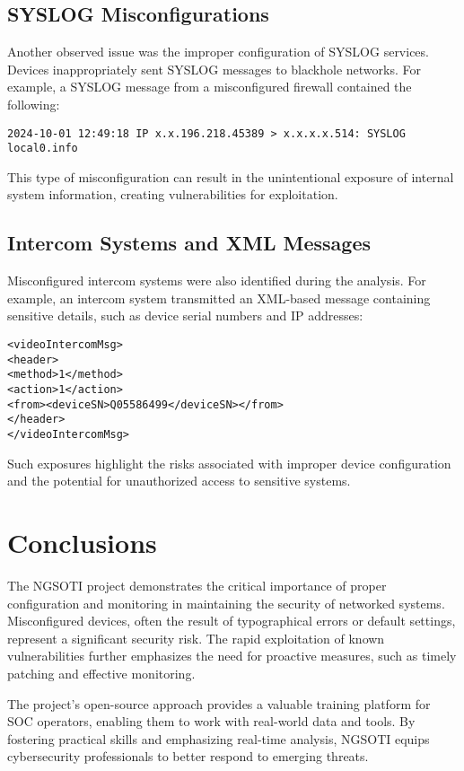 \section{SYSLOG Misconfigurations}
Another observed issue was the improper configuration of SYSLOG services. Devices inappropriately sent SYSLOG messages to blackhole networks. For example, a SYSLOG message from a misconfigured firewall contained the following:
\begin{verbatim}
2024-10-01 12:49:18 IP x.x.196.218.45389 > x.x.x.x.514: SYSLOG local0.info
\end{verbatim}
This type of misconfiguration can result in the unintentional exposure of internal system information, creating vulnerabilities for exploitation.

\section{Intercom Systems and XML Messages}
Misconfigured intercom systems were also identified during the analysis. For example, an intercom system transmitted an XML-based message containing sensitive details, such as device serial numbers and IP addresses:
\begin{verbatim}
<videoIntercomMsg>
<header>
<method>1</method>
<action>1</action>
<from><deviceSN>Q05586499</deviceSN></from>
</header>
</videoIntercomMsg>
\end{verbatim}
Such exposures highlight the risks associated with improper device configuration and the potential for unauthorized access to sensitive systems.

\chapter{Conclusions}
The NGSOTI project demonstrates the critical importance of proper configuration and monitoring in maintaining the security of networked systems. Misconfigured devices, often the result of typographical errors or default settings, represent a significant security risk. The rapid exploitation of known vulnerabilities further emphasizes the need for proactive measures, such as timely patching and effective monitoring.

The project's open-source approach provides a valuable training platform for SOC operators, enabling them to work with real-world data and tools. By fostering practical skills and emphasizing real-time analysis, NGSOTI equips cybersecurity professionals to better respond to emerging threats.



